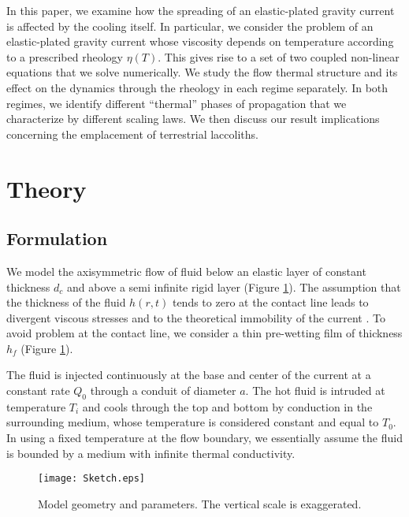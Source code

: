 In  this paper,  we examine  how  the spreading  of an  elastic-plated
gravity current is affected by  the cooling itself.  In particular, we
consider  the  problem  of  an elastic-plated  gravity  current  whose
viscosity depends  on temperature  according to a  prescribed rheology
$\eta(T)$.   This  gives rise  to  a  set  of two  coupled  non-linear
equations  that  we solve  numerically.   We  study the  flow  thermal
structure and its effect on the  dynamics through the rheology in each
regime separately.  In both regimes, we identify different ``thermal''
phases  of  propagation  that  we characterize  by  different  scaling
laws.  We   then  discuss  our  result   implications  concerning  the
emplacement of terrestrial laccoliths.


\section{Theory}
\label{sec:theory}

\subsection{Formulation}
\label{sec:formulation}

We model  the axisymmetric  flow of  fluid below  an elastic  layer of
constant  thickness  $d_c$  and  above a  semi  infinite  rigid  layer
\citep{Michaut:2011kg} (Figure \ref{Figure2-1}).   The assumption that
the thickness of the fluid $h(r,t)$  tends to zero at the contact line
leads to divergent viscous stresses  and to the theoretical immobility
of the current \citep{Flitton:1999iv}. To avoid problem at the contact
line,  we  consider  a  thin   pre-wetting  film  of  thickness  $h_f$
\citep{Lister:2013ia} (Figure \ref{Figure2-1}).

The  fluid is  injected continuously  at the  base and  center of  the
current  at  a constant  rate  $Q_0$  through  a conduit  of  diameter
$a$. The hot fluid is intruded  at temperature $T_i$ and cools through
the  top and  bottom by  conduction in  the surrounding  medium, whose
temperature is  considered constant  and equal to  $T_0$.  In  using a
fixed  temperature at  the flow  boundary, we  essentially assume  the
fluid is bounded by a medium with infinite thermal conductivity.

\begin{figure}
  \begin{center}
    \graphicspath{ {/Users/thorey/Documents/These/Projet/Refroidissement/Skin_Model/Figure/JFM_V13/} }
    \texttt{[image: Sketch.eps]}
    \caption{Model geometry and parameters. The vertical scale is exaggerated.}
    \label{Figure2-1}
  \end{center}
\end{figure}

